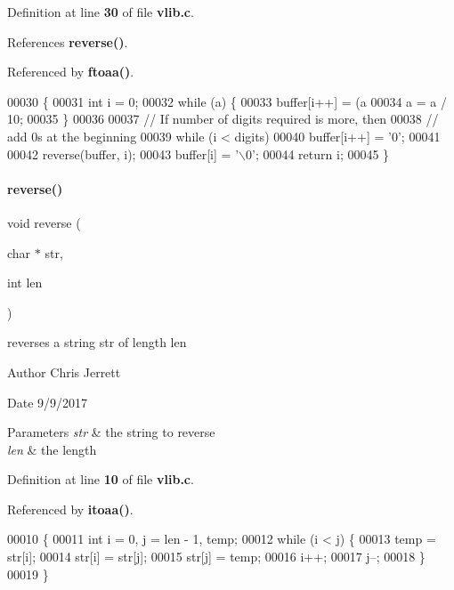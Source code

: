Definition at line \textbf{ 30} of file \textbf{ vlib.\+c}.



References \textbf{ reverse()}.



Referenced by \textbf{ ftoaa()}.


\begin{DoxyCode}
00030                                            \{
00031   \textcolor{keywordtype}{int} i = 0;
00032   \textcolor{keywordflow}{while} (a) \{
00033     buffer[i++] = (a %
00034     a = a / 10;
00035   \}
00036 
00037   \textcolor{comment}{// If number of digits required is more, then}
00038   \textcolor{comment}{// add 0s at the beginning}
00039   \textcolor{keywordflow}{while} (i < digits)
00040     buffer[i++] = \textcolor{charliteral}{'0'};
00041 
00042   reverse(buffer, i);
00043   buffer[i] = \textcolor{charliteral}{'\(\backslash\)0'};
00044   \textcolor{keywordflow}{return} i;
00045 \}
\end{DoxyCode}
\mbox{\label{a00071_aad7fea725cb4b198ace1aa3df5051244}} 
\paragraph{reverse()}
{\footnotesize\ttfamily void reverse (\begin{DoxyParamCaption}\item[{char $\ast$}]{str,  }\item[{int}]{len }\end{DoxyParamCaption})}



reverses a string \textquotesingle{}str\textquotesingle{} of length \textquotesingle{}len\textquotesingle{} 

\begin{DoxyAuthor}{Author}
Chris Jerrett 
\end{DoxyAuthor}
\begin{DoxyDate}{Date}
9/9/2017 
\end{DoxyDate}

\begin{DoxyParams}{Parameters}
{\em str} & the string to reverse \\
\hline
{\em len} & the length \\
\hline
\end{DoxyParams}


Definition at line \textbf{ 10} of file \textbf{ vlib.\+c}.



Referenced by \textbf{ itoaa()}.


\begin{DoxyCode}
00010                                  \{
00011   \textcolor{keywordtype}{int} i = 0, j = len - 1, temp;
00012   \textcolor{keywordflow}{while} (i < j) \{
00013     temp = str[i];
00014     str[i] = str[j];
00015     str[j] = temp;
00016     i++;
00017     j--;
00018   \}
00019 \}
\end{DoxyCode}

